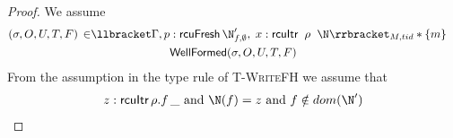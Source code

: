  \begin{proof}
 We assume
\begin{gather}\label{ahu1wf}
  \begin{aligned}
    (\sigma, O, U, T,F) \, \in &  \llbracket \Gamma, p:\textsf{rcuFresh}\,\N'_{f,\emptyset},\; x:\textsf{rcuItr}\;\; \rho \;\; \N \rrbracket_{M,tid} * \{m\}
    \end{aligned} \\
\textsf{WellFormed}(\sigma,O,U,T,F)
\label{ahu2wf}
\end{gather}
From the assumption in the type rule of \textsc{T-WriteFH} we assume that
\begin{gather}
z:\textsf{rcuItr}\,\rho.f\,\_ \text{ and } \N(f) = z \text{ and } f \notin dom(\N')
\label{ahu4wf} 
\end{gather}


\end{proof}
